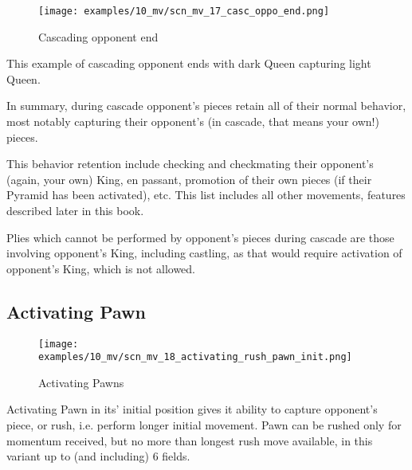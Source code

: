 \clearpage %

\noindent
\begin{wrapfigure}[4]{l}{0.5625\textwidth}
\centering
\texttt{[image: examples/10\_mv/scn\_mv\_17\_casc\_oppo\_end.png]}
\caption{Cascading opponent end}
\label{fig:scn_mv_17_casc_oppo_end}
\end{wrapfigure}
This example of cascading opponent ends with dark Queen capturing light Queen.

\vspace*{0.355\textheight}
In summary, during cascade opponent's pieces retain all of their normal behavior,
most notably capturing their opponent's (in cascade, that means your own!) pieces.

This behavior retention include checking and checkmating their opponent's (again,
your own) King, en passant, promotion of their own pieces (if their Pyramid has
been activated), etc. This list includes all other movements, features described
later in this book.

Plies which cannot be performed by opponent's pieces during cascade are those
involving opponent's King, including castling, as that would require activation
of opponent's King, which is not allowed.

\clearpage %

\subsection*{Activating Pawn}

\noindent
\begin{figure}[!h]
\texttt{[image: examples/10\_mv/scn\_mv\_18\_activating\_rush\_pawn\_init.png]}
\caption{Activating Pawns}
\label{fig:scn_mv_18_activating_rush_pawn_init}
\end{figure}

Activating Pawn in its' initial position gives it ability to capture opponent's
piece, or rush, i.e. perform longer initial movement. Pawn can be rushed only for
momentum received, but no more than longest rush move available, in this variant
up to (and including) 6 fields.

